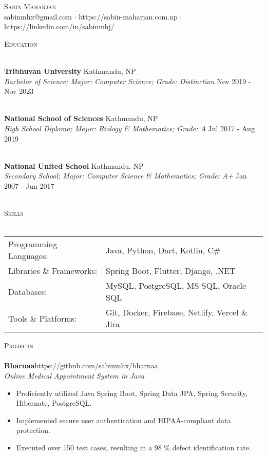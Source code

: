 \documentclass[a4paper]{article}
\newcommand{\lineunder} {
    \vspace*{-8pt} \\
    \hspace*{-18pt} \hrulefill \\
}
\newcommand{\header} [1] {
    {\hspace*{-18pt}\vspace*{6pt} \textsc{#1}}
    \vspace*{-6pt} \lineunder
}
\begin{document}
\vspace*{-40pt}

    

\vspace*{-10pt}
\begin{center}
	{\Huge \scshape {Sabin Maharjan}}\\
	sabinmhx@gmail.com $\cdot$ https://sabin-maharjan.com.np $\cdot$ https://linkedin.com/in/sabinmhj/\\
\end{center}



\header{Education}
\vspace{1mm}

\textbf{Tribhuvan University} \hfill Kathmandu, NP\\
\textit{Bachelor of Science; Major: Computer Science; Grade: Distinction} \hfill Nov 2019 - Nov 2023\\
\vspace{-1mm}
\

\textbf{National School of Sciences} \hfill Kathmandu, NP\\
\textit{High School Diploma; Major: Biology \& Mathematics; Grade: A} \hfill Jul 2017 - Aug 2019\\
\vspace{-1mm}
\

\textbf{National United School} \hfill Kathmandu, NP\\
\textit{Secondary School; Major: Computer Science \& Mathematics; Grade: A+} \hfill Jan 2007 - Jun 2017\\
\vspace{-1mm}
\


\header{Skills}
\begin{tabularx}{\textwidth}{ l X } 
	Programming Languages: & Java, Python, Dart, Kotlin, C\#      \\
	Libraries \& Frameworks:  & Spring Boot, Flutter, Django, .NET  \\
    Databases:  & MySQL, PostgreSQL, MS SQL, Oracle SQL  \\
    Tools \& Platforms:  & Git, Docker, Firebase, Netlify, Vercel \& Jira \\
\end{tabularx}
\vspace{2mm}

\header{Projects}

{\textbf{Bharnaa}}\hfill https://github.com/sabinmhx/bharnaa\\
\textit{Online Medical Appointment System in Java}
\begin{itemize} \itemsep 1pt
	\item Proficiently utilized Java Spring Boot, Spring Data JPA, Spring Security, Hibernate, PostgreSQL.
    \item Implemented secure user authentication and HIPAA-compliant data protection.
    \item Executed over 150 test cases, resulting in a 98 \% defect identification rate.
\end{itemize}
\vspace*{2mm}
\end{document}
